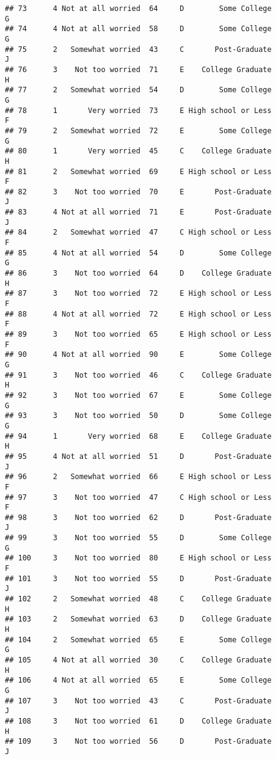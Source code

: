 \documentclass[
]{article}
\begin{document}
\begin{verbatim}
## 73      4 Not at all worried  64     D        Some College         G
## 74      4 Not at all worried  58     D        Some College         G
## 75      2   Somewhat worried  43     C       Post-Graduate         J
## 76      3    Not too worried  71     E    College Graduate         H
## 77      2   Somewhat worried  54     D        Some College         G
## 78      1       Very worried  73     E High school or Less         F
## 79      2   Somewhat worried  72     E        Some College         G
## 80      1       Very worried  45     C    College Graduate         H
## 81      2   Somewhat worried  69     E High school or Less         F
## 82      3    Not too worried  70     E       Post-Graduate         J
## 83      4 Not at all worried  71     E       Post-Graduate         J
## 84      2   Somewhat worried  47     C High school or Less         F
## 85      4 Not at all worried  54     D        Some College         G
## 86      3    Not too worried  64     D    College Graduate         H
## 87      3    Not too worried  72     E High school or Less         F
## 88      4 Not at all worried  72     E High school or Less         F
## 89      3    Not too worried  65     E High school or Less         F
## 90      4 Not at all worried  90     E        Some College         G
## 91      3    Not too worried  46     C    College Graduate         H
## 92      3    Not too worried  67     E        Some College         G
## 93      3    Not too worried  50     D        Some College         G
## 94      1       Very worried  68     E    College Graduate         H
## 95      4 Not at all worried  51     D       Post-Graduate         J
## 96      2   Somewhat worried  66     E High school or Less         F
## 97      3    Not too worried  47     C High school or Less         F
## 98      3    Not too worried  62     D       Post-Graduate         J
## 99      3    Not too worried  55     D        Some College         G
## 100     3    Not too worried  80     E High school or Less         F
## 101     3    Not too worried  55     D       Post-Graduate         J
## 102     2   Somewhat worried  48     C    College Graduate         H
## 103     2   Somewhat worried  63     D    College Graduate         H
## 104     2   Somewhat worried  65     E        Some College         G
## 105     4 Not at all worried  30     C    College Graduate         H
## 106     4 Not at all worried  65     E        Some College         G
## 107     3    Not too worried  43     C       Post-Graduate         J
## 108     3    Not too worried  61     D    College Graduate         H
## 109     3    Not too worried  56     D       Post-Graduate         J

\end{verbatim}
\end{document}

